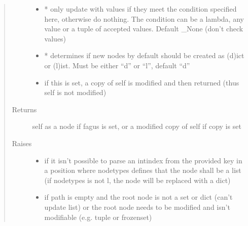 \documentclass[a4paper,10pt,english]{sphinxmanual}
\begin{document}
\begin{fulllineitems}
\begin{fulllineitems}
\begin{quote}
\begin{description}
\begin{itemize}
\item {}
\sphinxAtStartPar
{} \textendash{} * only update with values if they meet the condition specified here, otherwise do nothing. The
condition can be a lambda, any value or a tuple of accepted values. Default \_None (don’t check values)

\item {}
\sphinxAtStartPar
{} \textendash{} * determines if new nodes by default should be created as (d)ict or (l)ist. Must be
either “d” or “l”, default “d”

\item {}
\sphinxAtStartPar
{} \textendash{} if this is set, a copy of self is modified and then returned (thus self is not modified)

\end{itemize}

\item[{Returns}] \leavevmode
\sphinxAtStartPar
self as a node if fagus is set, or a modified copy of self if copy is set

\item[{Raises}] \leavevmode\begin{itemize}
\item {}
\sphinxAtStartPar
{} \textendash{} if it isn’t possible to parse an int\sphinxhyphen{}index from the provided key in a position where node\sphinxhyphen{}types
    defines that the node shall be a list (if node\sphinxhyphen{}types is not l, the node will be replaced with a dict)

\item {}
\sphinxAtStartPar
{} \textendash{} if path is empty and the root node is not a set or dict (can’t update list) or the root node
    needs to be modified and isn’t modifiable (e.g. tuple or frozenset)

\end{itemize}

\end{description}\end{quote}

\end{fulllineitems}



\end{fulllineitems}
\end{document}
